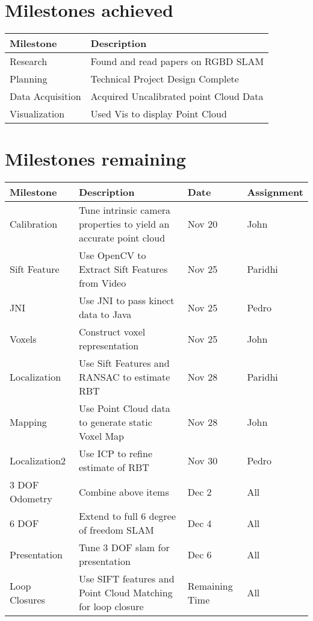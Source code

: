 \documentclass[12pt]{article}
\begin{document}
\section{Milestones achieved}
\begin{tabular}{| l | p{9cm} | }
\hline
Milestone & Description \\ \hline
Research & Found and read papers on RGBD SLAM \\ \hline
Planning & Technical Project Design Complete \\ \hline
Data Acquisition & Acquired Uncalibrated point Cloud Data \\ \hline
Visualization & Used Vis to display Point Cloud \\ \hline

\end{tabular}


\section{Milestones remaining}
\begin{tabular}{|l |p{7cm}| |p{2cm}| l|}
\hline
Milestone & Description & Date & Assignment \\ \hline
Calibration & Tune intrinsic camera properties to yield an accurate point cloud & Nov 20 & John \\ \hline
Sift Feature & Use OpenCV to Extract Sift  Features from Video & Nov 25 & Paridhi \\ \hline
JNI & Use JNI to pass kinect data to Java & Nov 25 & Pedro \\ \hline
Voxels & Construct voxel representation & Nov 25 & John \\ \hline
Localization & Use Sift Features and RANSAC to  estimate RBT & Nov 28 & Paridhi \\ \hline
Mapping & Use Point Cloud data to generate  static Voxel Map & Nov 28 & John \\ \hline
Localization2 & Use ICP to refine estimate of RBT & Nov 30 & Pedro \\ \hline
3 DOF Odometry & Combine above items & Dec 2 & All \\ \hline
6 DOF & Extend to full 6 degree of freedom SLAM & Dec 4 & All \\ \hline
Presentation & Tune 3 DOF slam for presentation & Dec 6 & All \\ \hline
Loop Closures & Use SIFT features and Point Cloud  Matching for loop closure & Remaining Time & All \\ \hline

\end{tabular}
\end{document}
